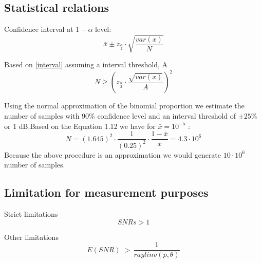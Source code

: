 \subsection{Statistical relations}


Confidence interval at $1-\alpha$ level:
\begin{equation}\label{interval}
\bar{x} \pm z_{\frac{\alpha}{2}} \cdot \sqrt{\frac{var(x)}{N}}
\end{equation}

Based on \autoref{interval} assuming a interval threshold, A
\begin{equation}\label{interval2}
N \geq \left(z_{\frac{\alpha}{2}} \cdot \frac{\sqrt{var(x)}}{A} \right)^2
\end{equation}

Using the normal approximation of the binomial proportion we  estimate the number of samples with 90\% confidence level and an interval threshold of $\pm 25\%$ or 1 dB.Based on the Equation 1.12 we have for $ \bar{x} = 10^{-5} $ :
\begin{equation}\label{sampleEQ}
N=(1.645)^{2} \cdot \frac{1}{(0.25)^{2}} \cdot \frac{1-\bar{x}}{\bar{x}} = 4.3 \cdot 10^{6}
\end{equation}
Because the above procedure is an approximation we would generate $ 10 \cdot 10^{6} $ number of samples.\citep{SampleNumURC}
\subsection{Limitation for measurement purposes}

Strict limitations
\begin{equation}
SNRs > 1
\end{equation}

Other limitations
\begin{equation}
E\left(SNR\right) \;>\, \frac{1}{raylinv(p,\theta)} 
\end{equation}

\begin{where}
\end{where}



